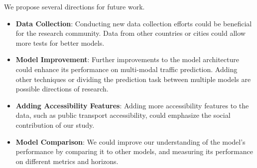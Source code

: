 We propose several directions for future work.
\begin{itemize}
    \item \textbf{Data Collection}:
    Conducting new data collection efforts could be beneficial for the research community.
    Data from other countries or cities could allow more tests for better models.
    \item \textbf{Model Improvement}:
    Further improvements to the model architecture could enhance its performance on multi-modal traffic prediction.
    Adding other techniques or dividing the prediction task between multiple models are possible directions of research.
    \item \textbf{Adding Accessibility Features}:
    Adding more accessibility features to the data, such as public transport accessibility, could emphasize the social
    contribution of our study.
    \item \textbf{Model Comparison}:
    We could improve our understanding of the model's performance by comparing it to other models, and measuring its
    performance on different metrics and horizons.
\end{itemize}
\vspace{1em}
